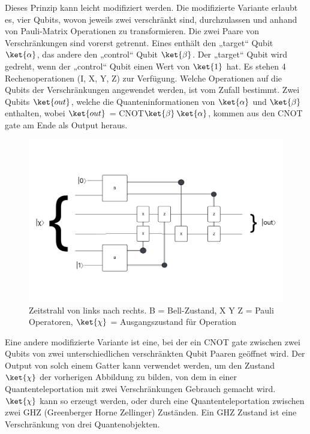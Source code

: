 \newpage
\noindent Dieses Prinzip kann leicht modifiziert werden. Die modifizierte Variante erlaubt es, vier Qubits, wovon jeweils zwei verschränkt sind, durchzulassen und anhand von Pauli-Matrix Operationen zu transformieren. Die zwei Paare von Verschränkungen sind vorerst getrennt. Eines enthält den „target“ Qubit \(\ket{\alpha}\), das andere den „control“ Qubit \(\ket{\beta}\). Der „target“ Qubit wird gedreht, wenn der „control“ Qubit einen Wert von \(\ket{1}\) hat. Es stehen 4 Rechenoperationen (I, X, Y, Z) zur Verfügung. Welche Operationen auf die Qubits der Verschränkungen angewendet werden, ist vom Zufall bestimmt. Zwei Qubits \(\ket{out}\), welche die Quanteninformationen von \(\ket{\alpha}\) und \(\ket{\beta}\) enthalten, wobei \(\ket{out}\) = CNOT\(\ket{\beta}\)\(\ket{\alpha}\), kommen aus den CNOT gate am Ende als Output heraus.\\
\begin{figure}[h!]
    \centering
    \includegraphics[width=1.0\textwidth]{images/quantum-information/quantenteleportation_cnot_2.jpeg}
    \caption{Zeitstrahl von links nach rechts. B = Bell-Zustand, X Y Z = Pauli Operatoren, \(\ket{\chi}\) = Ausgangszustand für Operation}
    \label{fig:meinbild}
\end{figure}
\newpage
\noindent Eine andere modifizierte Variante ist eine, bei der ein CNOT gate zwischen zwei Qubits von zwei unterschiedlichen verschränkten Qubit Paaren geöffnet wird. Der Output von solch einem Gatter kann verwendet werden, um den Zustand \(\ket{\chi}\) der vorherigen Abbildung zu bilden, von dem in einer Quantenteleportation mit zwei Verschränkungen Gebrauch gemacht wird. \(\ket{\chi}\) kann so erzeugt werden, oder durch eine Quantenteleportation zwischen zwei GHZ (Greenberger Horne Zellinger) Zuständen. Ein GHZ Zustand ist eine Verschränkung von drei Quantenobjekten.\\
